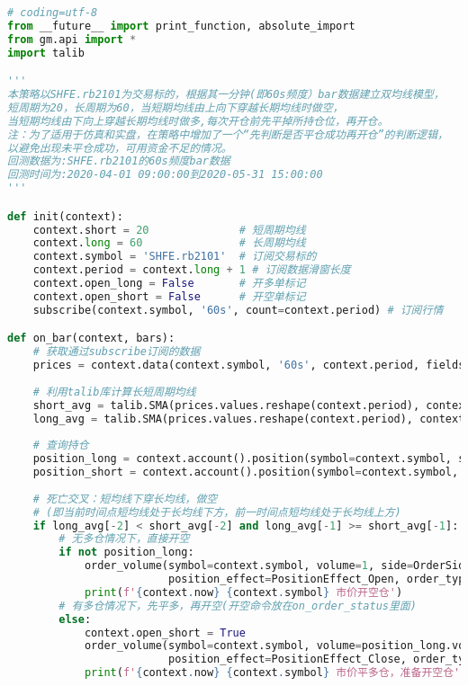 \documentclass[UTF8]{ctexart}
\begin{document}
\begin{lstlisting}[language=Python, caption={双均线策略Python实现代码}, label={code:strategy}]
# coding=utf-8
from __future__ import print_function, absolute_import
from gm.api import *
import talib

'''
本策略以SHFE.rb2101为交易标的，根据其一分钟(即60s频度）bar数据建立双均线模型，
短周期为20，长周期为60，当短期均线由上向下穿越长期均线时做空，
当短期均线由下向上穿越长期均线时做多,每次开仓前先平掉所持仓位，再开仓。
注：为了适用于仿真和实盘，在策略中增加了一个“先判断是否平仓成功再开仓”的判断逻辑，
以避免出现未平仓成功，可用资金不足的情况。
回测数据为:SHFE.rb2101的60s频度bar数据
回测时间为:2020-04-01 09:00:00到2020-05-31 15:00:00
'''

def init(context):
    context.short = 20              # 短周期均线
    context.long = 60               # 长周期均线
    context.symbol = 'SHFE.rb2101'  # 订阅交易标的
    context.period = context.long + 1 # 订阅数据滑窗长度
    context.open_long = False       # 开多单标记
    context.open_short = False      # 开空单标记
    subscribe(context.symbol, '60s', count=context.period) # 订阅行情

def on_bar(context, bars):
    # 获取通过subscribe订阅的数据
    prices = context.data(context.symbol, '60s', context.period, fields='close')
    
    # 利用talib库计算长短周期均线
    short_avg = talib.SMA(prices.values.reshape(context.period), context.short)
    long_avg = talib.SMA(prices.values.reshape(context.period), context.long)
    
    # 查询持仓
    position_long = context.account().position(symbol=context.symbol, side=PositionSide_Long)
    position_short = context.account().position(symbol=context.symbol, side=PositionSide_Short)
    
    # 死亡交叉：短均线下穿长均线，做空
    # (即当前时间点短均线处于长均线下方，前一时间点短均线处于长均线上方)
    if long_avg[-2] < short_avg[-2] and long_avg[-1] >= short_avg[-1]:
        # 无多仓情况下，直接开空
        if not position_long:
            order_volume(symbol=context.symbol, volume=1, side=OrderSide_Sell, 
                         position_effect=PositionEffect_Open, order_type=OrderType_Market)
            print(f'{context.now} {context.symbol} 市价开空仓')
        # 有多仓情况下，先平多，再开空(开空命令放在on_order_status里面)
        else:
            context.open_short = True
            order_volume(symbol=context.symbol, volume=position_long.volume, side=OrderSide_Sell, 
                         position_effect=PositionEffect_Close, order_type=OrderType_Market)
            print(f'{context.now} {context.symbol} 市价平多仓，准备开空仓')


\end{lstlisting}
\end{document}
